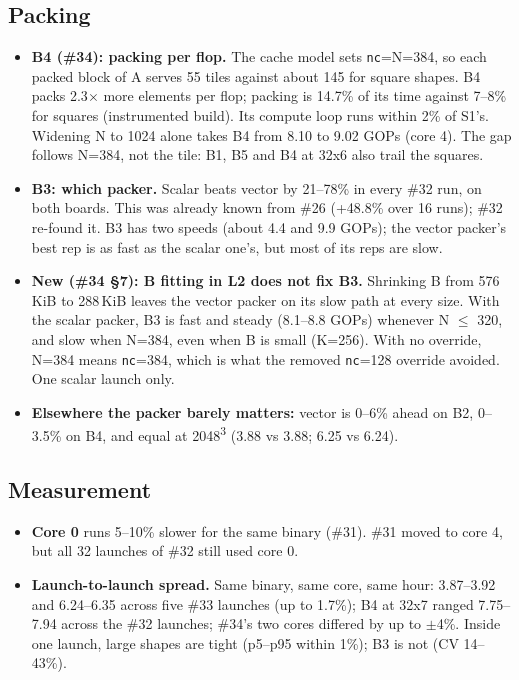 \documentclass[10pt,a4paper]{article}
\begin{document}
\subsection{Packing}
\begin{itemize}
  \item \textbf{B4 (\#34): packing per flop.} The cache model sets \texttt{nc}=N=384, so each packed
  block of A serves 55 tiles against about 145 for square shapes. B4 packs 2.3$\times$ more elements
  per flop; packing is 14.7\% of its time against 7--8\% for squares (instrumented build). Its compute
  loop runs within 2\% of S1's. Widening N to 1024 alone takes B4 from 8.10 to 9.02 GOPs (core 4).
  The gap follows N=384, not the tile: B1, B5 and B4 at 32x6 also trail the squares.
  \item \textbf{B3: which packer.} Scalar beats vector by 21--78\% in every \#32 run, on both boards.
  This was already known from \#26 (+48.8\% over 16 runs); \#32 re-found it. B3 has two speeds (about
  4.4 and 9.9 GOPs); the vector packer's best rep is as fast as the scalar one's, but most of its reps
  are slow.
  \item \textbf{New (\#34 \S7): B fitting in L2 does not fix B3.} Shrinking B from 576\,KiB to
  288\,KiB leaves the vector packer on its slow path at every size. With the scalar packer, B3 is fast
  and steady (8.1--8.8 GOPs) whenever N $\le$ 320, and slow when N=384, even when B is small
  (K=256). With no override, N=384 means \texttt{nc}=384, which is what the removed
  \texttt{nc}=128 override avoided. One scalar launch only.
  \item \textbf{Elsewhere the packer barely matters:} vector is 0--6\% ahead on B2, 0--3.5\% on B4, and
  equal at 2048\textsuperscript{3} (3.88 vs 3.88; 6.25 vs 6.24).
\end{itemize}

\subsection{Measurement}
\begin{itemize}
  \item \textbf{Core 0} runs 5--10\% slower for the same binary (\#31). \#31 moved to core 4, but all 32
  launches of \#32 still used core 0.
  \item \textbf{Launch-to-launch spread.} Same binary, same core, same hour: 3.87--3.92 and
  6.24--6.35 across five \#33 launches (up to 1.7\%); B4 at 32x7 ranged 7.75--7.94 across the \#32
  launches; \#34's two cores differed by up to $\pm$4\%. Inside one launch, large shapes are tight
  (p5--p95 within 1\%); B3 is not (CV 14--43\%).
\end{itemize}
\end{document}
